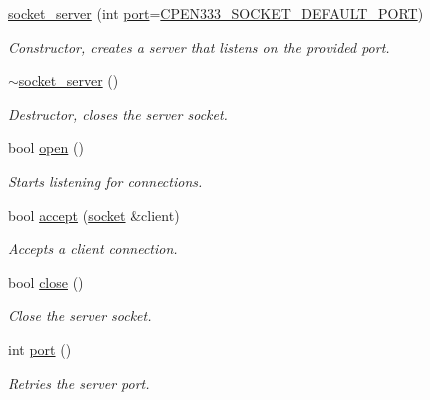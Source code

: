 \begin{DoxyCompactItemize}
\item 
\hyperlink{classcpen333_1_1process_1_1posix_1_1socket__server_a245c4208b3be5daf334e4123ba0836c7}{socket\+\_\+server} (int \hyperlink{classcpen333_1_1process_1_1posix_1_1socket__server_a5962af3110c19660b29f154f867e87e2}{port}=\hyperlink{impl_2windows_2socket_8h_a5164d95d122c5161aceda0d59b962e2e}{C\+P\+E\+N333\+\_\+\+S\+O\+C\+K\+E\+T\+\_\+\+D\+E\+F\+A\+U\+L\+T\+\_\+\+P\+O\+RT})
\begin{DoxyCompactList}\small\item\em Constructor, creates a server that listens on the provided port. \end{DoxyCompactList}\item 
\hyperlink{classcpen333_1_1process_1_1posix_1_1socket__server_a2d07def5c83de193cc2f19c51be31c17}{$\sim$socket\+\_\+server} ()
\begin{DoxyCompactList}\small\item\em Destructor, closes the server socket. \end{DoxyCompactList}\item 
bool \hyperlink{classcpen333_1_1process_1_1posix_1_1socket__server_a3da498856b5fb812e2e983561cf88944}{open} ()
\begin{DoxyCompactList}\small\item\em Starts listening for connections. \end{DoxyCompactList}\item 
bool \hyperlink{classcpen333_1_1process_1_1posix_1_1socket__server_ae68768699a5ddc4550263dd758f4e708}{accept} (\hyperlink{classcpen333_1_1process_1_1posix_1_1socket}{socket} \&client)
\begin{DoxyCompactList}\small\item\em Accepts a client connection. \end{DoxyCompactList}\item 
bool \hyperlink{classcpen333_1_1process_1_1posix_1_1socket__server_a306aea15eb1c856f269b1c3727fbfa17}{close} ()
\begin{DoxyCompactList}\small\item\em Close the server socket. \end{DoxyCompactList}\item 
int \hyperlink{classcpen333_1_1process_1_1posix_1_1socket__server_a5962af3110c19660b29f154f867e87e2}{port} ()
\begin{DoxyCompactList}\small\item\em Retries the server port. \end{DoxyCompactList}\end{DoxyCompactItemize}
